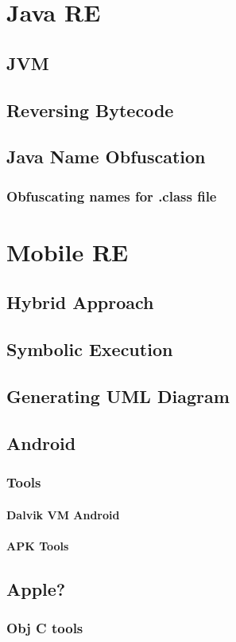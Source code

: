 \section{Java RE}
\subsection{JVM}
\subsection{Reversing Bytecode}
\subsection{Java Name Obfuscation}
\subsubsection{Obfuscating names for .class file}

\section{Mobile RE}
\subsection{Hybrid Approach}
\subsection{Symbolic Execution}
\subsection{Generating UML Diagram}
\subsection{Android}
\subsubsection{Tools}
\paragraph{Dalvik VM Android}
\paragraph{APK Tools}
\subsection{Apple?}
\subsubsection{Obj C tools}




 

